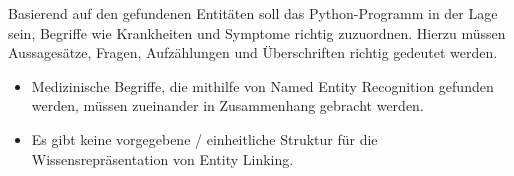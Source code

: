 Basierend auf den gefundenen Entitäten soll das Python-Programm in der Lage sein, Begriffe wie Krankheiten und Symptome richtig zuzuordnen. Hierzu müssen Aussagesätze, Fragen, Aufzählungen und Überschriften richtig gedeutet werden.

\begin{itemize}
\item Medizinische Begriffe, die mithilfe von Named Entity Recognition gefunden werden, müssen zueinander in Zusammenhang gebracht werden.
\item Es gibt keine vorgegebene / einheitliche Struktur für die Wissensrepräsentation von Entity Linking.
\end{itemize}


